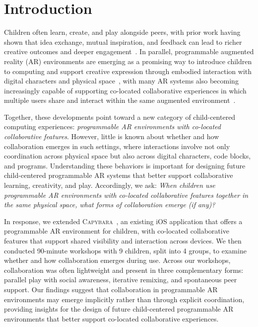 \documentclass[sigconf,nonacm]{acmart}
\newcommand{\capybara}{\textsc{Capybara}\xspace}
\begin{document}
\section{Introduction}
Children often learn, create, and play alongside peers, with prior work having shown that idea exchange, mutual inspiration, and feedback can lead to richer creative outcomes and deeper engagement~\cite{Bruckman98, Hernandez07, Brennan10, Resnick17}. In parallel, programmable augmented reality (AR) environments are emerging as a promising way to introduce children to computing and support creative expression through embodied interaction with digital characters and physical space~\cite{Liaqat25, Lei25, Alves25, Chung25}, with many AR systems also becoming increasingly capable of supporting co-located collaborative experiences in which multiple users share and interact within the same augmented environment~\cite{Guo21, Poretski21, Dagan22, Petrov23, Numan25, Wang25}. 

Together, these developments point toward a new category of child-centered computing experiences: \textit{programmable AR environments with co-located collaborative features}. However, little is known about whether and how collaboration emerges in such settings, where interactions involve not only coordination across physical space but also across digital characters, code blocks, and programs. Understanding these behaviors is important for designing future child-centered programmable AR systems that better support collaborative learning, creativity, and play. Accordingly, we ask: \textit{When children use programmable AR environments with co-located collaborative features together in the same physical space, what forms of collaboration emerge (if any)?} 

In response, we extended \capybara~\cite{Lei25}, an existing iOS application that offers a programmable AR environment for children, with co-located collaborative features that support shared visibility and interaction across devices. We then conducted 90-minute workshops with 9 children, split into 4 groups, to examine whether and how collaboration emerges during use. Across our workshops, collaboration was often lightweight and present in three complementary forms: parallel play with social awareness, iterative remixing, and spontaneous peer support. Our findings suggest that collaboration in programmable AR environments may emerge implicitly rather than through explicit coordination, providing insights for the design of future child-centered programmable AR environments that better support co-located collaborative experiences.
\end{document}
